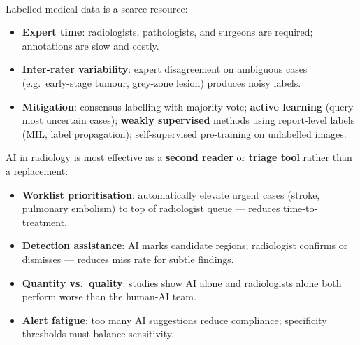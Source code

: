\begin{tcbitemize}[ skin=sectionraster ]
    \tcbitem[title={Annotation Challenges}, raster multicolumn=3]
    Labelled medical data is a scarce resource\textsuperscript{\cite[][pp.~232--233]{challenArtificialIntelligenceBias2019}}:
    \begin{itemize}
        \item \textbf{Expert time}: radiologists, pathologists, and surgeons are required; annotations are slow and costly.
        \item \textbf{Inter-rater variability}: expert disagreement on ambiguous cases (e.g.\ early-stage tumour, grey-zone lesion) produces noisy labels.
        \item \textbf{Mitigation}: consensus labelling with majority vote; \textbf{active learning} (query most uncertain cases); \textbf{weakly supervised} methods using report-level labels (MIL, label propagation); self-supervised pre-training on unlabelled images.
    \end{itemize}

    \tcbitem[title={Radiologist-AI Collaboration}, raster multicolumn=3]
    AI in radiology is most effective as a \textbf{second reader} or \textbf{triage tool} rather than a replacement:
    \begin{itemize}
        \item \textbf{Worklist prioritisation}: automatically elevate urgent cases (stroke, pulmonary embolism) to top of radiologist queue — reduces time-to-treatment.
        \item \textbf{Detection assistance}: AI marks candidate regions; radiologist confirms or dismisses — reduces miss rate for subtle findings.
        \item \textbf{Quantity vs.\ quality}: studies show AI alone and radiologists alone both perform worse than the human-AI team.
        \item \textbf{Alert fatigue}: too many AI suggestions reduce compliance; specificity thresholds must balance sensitivity.
    \end{itemize}


\end{tcbitemize}
